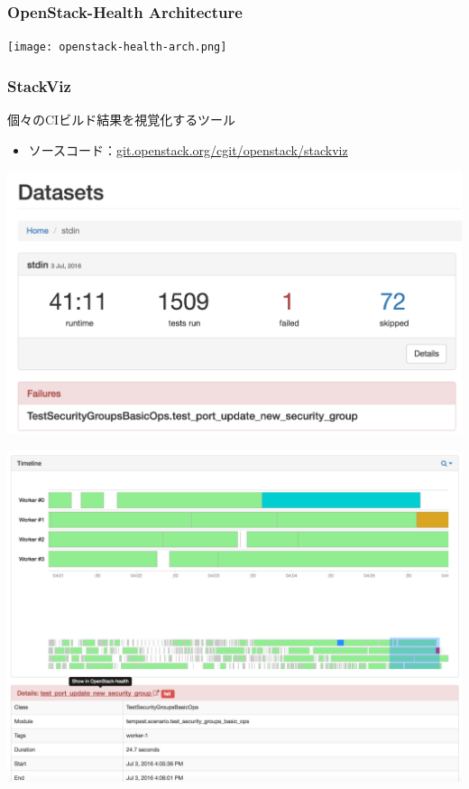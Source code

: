 \documentclass[aspectratio=169,11pt,hyperref={colorlinks=true}]{beamer}
\begin{document}
\begin{frame}
  \frametitle{OpenStack-Health Architecture}
  \begin{center}
    \texttt{[image: openstack-health-arch.png]}
  \end{center}
\end{frame}

\begin{frame}
  \frametitle{StackViz}
  個々のCIビルド結果を視覚化するツール
  \begin{itemize}
    \item ソースコード：\href{http://git.openstack.org/cgit/openstack/stackviz}{git.openstack.org/cgit/openstack/stackviz}
  \end{itemize}
  \begin{center}
    \includegraphics[width=1.3\textheight]{stackviz-sample-top.png}
  \end{center}
\end{frame}

\begin{frame}
  \begin{center}
    \includegraphics[width=1.3\textheight]{stackviz-sample-timeline.png}
  \end{center}
\end{frame}
\end{document}
